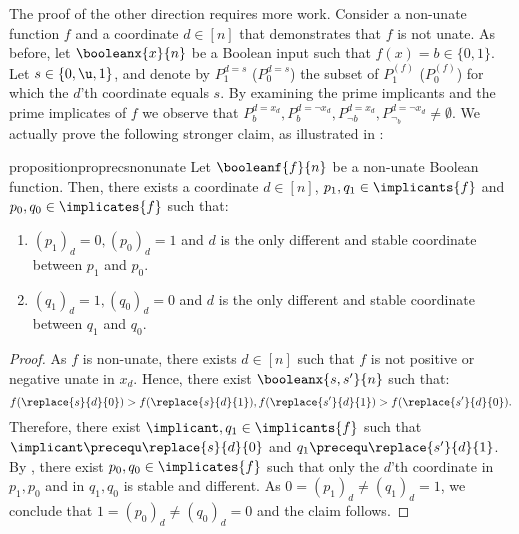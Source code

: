 \documentclass[acmsmall, nonacm, authorversion]{acmart}
\begin{document}
The proof of the other direction requires more work. Consider a non-unate function $f$ and a coordinate $d\in [n]$ that demonstrates that $f$ is not unate. As before, let $\booleanx{x}{n}$ be a Boolean input such that $f(x)=b\in\{0,1\}$. 
Let $s\in\{0,\u,1\}$, and denote by $P_1^{d=s}$ ($P_0^{d=s}$) the subset of $P_1^{(f)}$ ($P_0^{(f)}$) for which the $d$'th coordinate equals $s$. By examining the prime implicants and the prime implicates of $f$ we observe that $P_{b}^{d=x_d},P_{b}^{d=\neg x_d},P_{\neg b}^{d=x_d},P_{\neg_b}^{d=\neg x_d}\neq \emptyset$. 
We actually prove the following stronger claim, as illustrated in :

\begin{restatable}{proposition}{proprecsnonunate}\label{prop:recs-non-unate}
Let $\booleanf{f}{n}$ be a non-unate Boolean function. Then, there exists a coordinate $d\in[n]$, $p_1,q_1\in \implicants{f}$ and $p_0,q_0\in \implicates{f}$ such that:
\begin{enumerate}
    \item $(p_1)_d=0,(p_0)_d=1$ and $d$ is the only different and stable coordinate between $p_1$ and $p_0$.
    \item $(q_1)_d=1,(q_0)_d=0$ and $d$ is the only different and stable coordinate between $q_1$ and $q_0$.
\end{enumerate} 
\end{restatable}
\begin{proof}
As $f$ is non-unate, there exists $d\in [n]$ such that $f$ is not positive or negative unate in $x_{d}$. Hence, there exist $\booleanx{s,s'}{n}$ such that:
\[
    f(\replace{s}{d}{0}) > f(\replace{s}{d}{1}), f(\replace{s'}{d}{1}) > f(\replace{s'}{d}{0}).
\]
Therefore, there exist $\implicant, q_1 \in \implicants{f}$ such that $\implicant \precequ \replace{s}{d}{0}$ and $q_1 \precequ \replace{s'}{d}{1}$.
By , there exist $p_0,q_0\in \implicates{f}$ such that only the $d$'th coordinate in $p_1,p_0$ and in $q_1,q_0$ is stable and different. As $0=(p_1)_d\neq (q_1)_d=1$, we conclude that $1=(p_0)_d\neq (q_0)_d=0$ and the claim follows.
\end{proof}
\end{document}
